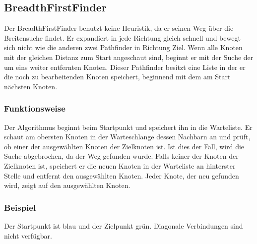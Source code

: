 \subsection{BreadthFirstFinder}

Der BreadthFirstFinder benutzt keine Heuristik, da er seinen Weg über die
Breitensuche findet. Er expandiert in jede Richtung gleich schnell und
bewegt sich nicht wie die anderen zwei Pathfinder in Richtung Ziel. Wenn
alle Knoten mit der gleichen Distanz zum Start angeschaut sind, beginnt
er mit der Suche der um eins weiter entfernten Knoten. Dieser Pathfinder
besitzt eine Liste in der er die noch zu bearbeitenden Knoten speichert,
beginnend mit dem am Start nächsten Knoten.
\cite[Brilliant.org]{brilliantbfs}

\subsubsection{Funktionsweise}

Der Algorithmus beginnt beim Startpunkt und speichert ihn in die Warteliste. Er schaut am
obersten Knoten in der Warteschlange dessen Nachbarn an und prüft, ob
einer der ausgewählten Knoten der Zielknoten ist. Ist dies der Fall, wird
die Suche abgebrochen, da der Weg gefunden wurde. Falls keiner der
Knoten der Zielknoten ist, speichert er die neuen Knoten in der Warteliste
an hinterster Stelle und entfernt den ausgewählten Knoten. Jeder Knote,
der neu gefunden wird, zeigt auf den ausgewählten Knoten.

\subsubsection{Beispiel}

Der Startpunkt ist blau und der Zielpunkt grün. Diagonale Verbindungen sind nicht verfügbar.

